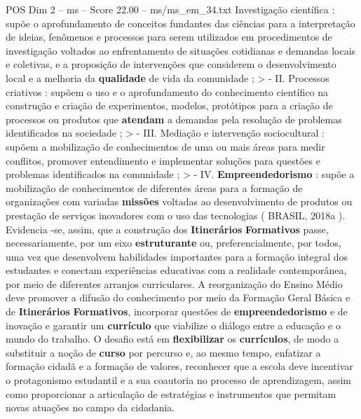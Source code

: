 \begin{textsample}{POS Dim 2 – ms – Score 22.00 – ms/ms\_em\_34.txt}
Investigação científica : supõe o aprofundamento de conceitos fundantes das ciências para a interpretação de ideias, fenômenos e processos para serem utilizados em procedimentos de investigação voltados ao enfrentamento de situações cotidianas e demandas locais e coletivas, e a proposição de intervenções que considerem o desenvolvimento local e a melhoria da \textbf{qualidade} de vida da comunidade ; > - II.
Processos criativos : supõem o uso e o aprofundamento do conhecimento científico na construção e criação de experimentos, modelos, protótipos para a criação de processos ou produtos que \textbf{atendam} a demandas pela resolução de problemas identificados na sociedade ; > - III.
Mediação e intervenção sociocultural : supõem a mobilização de conhecimentos de uma ou mais áreas para medir conflitos, promover entendimento e implementar soluções para questões e problemas identificados na comunidade ; > - IV. \textbf{Empreendedorismo} : supõe a mobilização de conhecimentos de diferentes áreas para a formação de organizações com variadas \textbf{missões} voltadas ao desenvolvimento de produtos ou prestação de serviços inovadores com o uso das tecnologias ( BRASIL, 2018a ).
Evidencia -se, assim, que a construção dos \textbf{Itinerários} \textbf{Formativos} passe, necessariamente, por um eixo \textbf{estruturante} ou, preferencialmente, por todos, uma vez que desenvolvem habilidades importantes para a formação integral dos estudantes e conectam experiências educativas com a realidade contemporânea, por meio de diferentes arranjos curriculares.
A reorganização do Ensino Médio deve promover a difusão do conhecimento por meio da Formação Geral Básica e de \textbf{Itinerários} \textbf{Formativos}, incorporar questões de \textbf{empreendedorismo} e de inovação e garantir um \textbf{currículo} que viabilize o diálogo entre a educação e o mundo do trabalho.
O desafio está em \textbf{flexibilizar} os \textbf{currículos}, de modo a substituir a noção de \textbf{curso} por percurso e, ao mesmo tempo, enfatizar a formação cidadã e a formação de valores, reconhecer que a escola deve incentivar o protagonismo estudantil e a sua coautoria no processo de aprendizagem, assim como proporcionar a articulação de estratégias e instrumentos que permitam novas atuações no campo da cidadania.

\end{textsample}
